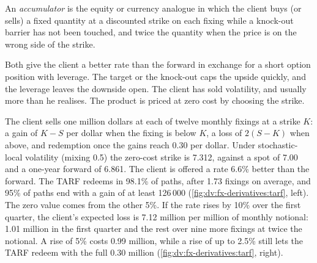 \begin{definition}[Accumulator]\label{def:dv:fx-derivatives:accumulator}
An \emph{accumulator} is the equity or currency analogue in which the client buys (or sells) a fixed quantity at a
discounted strike on each fixing while a knock-out barrier has not been touched, and twice the quantity when the price is on the wrong
side of the strike.
\end{definition}

Both give the client a better rate than the forward in exchange for a short option position with leverage. The target or the knock-out
caps the upside quickly, and the leverage leaves the downside open. The client has sold volatility, and usually more than he realises.
The product is priced at zero cost by choosing the strike.

\begin{example}\label{ex:dv:fx-derivatives:tarf}
The client sells one million dollars at each of twelve monthly fixings at a strike $K$: a gain of $K-S$ per dollar when the fixing is below
$K$, a loss of $2(S-K)$ when above, and redemption once the gains reach 0.30 per dollar. Under stochastic-local volatility (mixing 0.5) the
zero-cost strike is 7.312, against a spot of 7.00 and a one-year forward of 6.861. The client is offered a rate 6.6\% better than the
forward. The TARF redeems in 98.1\% of paths, after 1.73 fixings on average, and 95\% of paths end with a gain of at least 126\,000
(\cref{fig:dv:fx-derivatives:tarf}, left). The zero value comes from the other 5\%. If the rate rises by 10\% over the first quarter, the
client's expected loss is 7.12 million per million of monthly notional: 1.01 million in the first quarter and the rest over nine more
fixings at twice the notional. A rise of 5\% costs 0.99 million, while a rise of up to 2.5\% still lets the TARF redeem with the full
0.30 million (\cref{fig:dv:fx-derivatives:tarf}, right).
\end{example}


